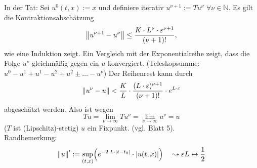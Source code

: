 In der Tat: Sei $u^0(t,x) := x$ und definiere iterativ $u^{\nu +1} := T u^\nu$ $\forall \nu \in \mathds{N}$. Es gilt die Kontraktionsabschätzung 
\[
	\norm{u^{\nu +1} - u^\nu} \le \frac{K \cdot L^\nu \cdot \varepsilon^{\nu +1} }{(\nu +1)!}, 
\]
wie eine Induktion zeigt. Ein Vergleich mit der Exponentialreihe zeigt, dass die Folge $u^\nu$ gleichmäßig gegen ein $u$ konvergiert. (Teleskopsumme: 
$u^0 - u^1 + u^1 - u^2 + u^2 \pm \ldots - u^\nu$) Der Reihenrest kann durch 
\[
	\norm{u^\nu - u} < \frac{K}{L} \cdot \frac{(L \cdot \varepsilon)^{\nu +1}}{(\nu+1)!} \cdot e^{L \cdot \varepsilon}   
\]
abgeschätzt werden. Also ist wegen 
\[
	T u = \lim_{\nu \to \infty} T u^\nu = \lim_{ \nu \to \infty} u^\nu = u
\]
($T$ ist (Lipschitz)-stetig) $u$ ein Fixpunkt. (vgl. Blatt 5). \\
Randbemerkung:
\[
	\norm{u}' := \sup_{(t,x)} \enbrace*{e^{-2 \cdot L \cdot \abs*{t-t_0} } \cdot \abs*{u(t,x)} }  \quad \leadsto \varepsilon L \leftrightarrow \frac{1}{2} 
\]

